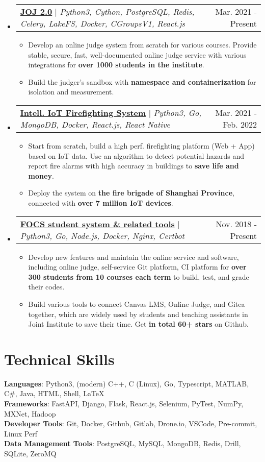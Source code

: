 \documentclass[letterpaper,11pt]{article}
\makeatletter
\newcommand{\resumeItem}[1]{
  \item\small{
    {#1 \vspace{-2pt}}
  }
}
\newcommand{\resumeProjectHeader}[2]{
    \item
    \begin{tabular*}{0.97\textwidth}{l@{\extracolsep{\fill}}r}
      \small#1 & #2 \\
    \end{tabular*}\vspace{-7pt}
}
\newcommand{\resumeSubHeaderListStart}{\begin{itemize}[leftmargin=0.15in, label={}]}
\newcommand{\resumeSubHeaderListEnd}{\end{itemize}}
\newcommand{\resumeItemListStart}{\begin{itemize}}
\newcommand{\resumeItemListEnd}{\end{itemize}\vspace{-5pt}}
\makeatother
\begin{document}
    \resumeSubHeaderListStart
      \resumeProjectHeader
        {\href{https://github.com/joint-online-judge}{\textbf{JOJ 2.0}} $|$ \emph{Python3, Cython, PostgreSQL, Redis, Celery, LakeFS, Docker, CGroupsV1, React.js}}{Mar. 2021 - Present}
        \resumeItemListStart
          \resumeItem{Develop an online judge system from scratch for various courses. Provide stable, secure, fast, well-documented online judge service with various integrations for \textbf{over 1000 students in the institute}.}
          \resumeItem{Build the judger's sandbox with \textbf{namespace and containerization} for isolation and measurement.}
        \resumeItemListEnd
      \resumeProjectHeader
        {\href{https://github.com/SJTU-IPP-Firefighting}{\textbf{Intell. IoT Firefighting System}} $|$ \emph{Python3, Go, MongoDB, Docker, React.js, React Native}}{Mar. 2021 - Feb. 2022}
        \resumeItemListStart
          \resumeItem{Start from scratch, build a high perf. firefighting platform (Web + App) based on IoT data. Use an algorithm to detect potential hazards and report fire alarms with high accuracy in buildings to \textbf{save life and money}.}
          \resumeItem{Deploy the system on \textbf{the fire brigade of Shanghai Province}, connected with \textbf{over 7 million IoT devices}.}
        \resumeItemListEnd
      \resumeProjectHeader
        {\href{https://gist.github.com/BoYanZh/fc4469c20fd6adf42c212114532aaac0}{\textbf{FOCS student system \& related tools}} $|$ \emph{Python3, Go, Node.js, Docker, Nginx, Certbot}}{Nov. 2018 - Present}
        \resumeItemListStart
          \resumeItem{Develop new features and maintain the online service and software, including online judge, self-service Git platform, CI platform for \textbf{over 300 students from 10 courses each term} to build, test, and grade their codes.}
          \resumeItem{Build various tools to connect Canvas LMS, Online Judge, and Gitea together, which are widely used by students and teaching assistants in Joint Institute to save their time. Get \textbf{in total 60+ stars} on Github.}
        \resumeItemListEnd
    \resumeSubHeaderListEnd


%
\section{Technical Skills}
 \begin{itemize}[leftmargin=0.15in, label={}]
    \small{\item{
     \textbf{Languages}{: Python3, (modern) C++, C (Linux), Go, Typescript, MATLAB, C\#, Java, HTML, Shell, \LaTeX} \\
     \textbf{Frameworks}{: FastAPI, Django, Flask, React.js, Selenium, PyTest, NumPy, MXNet, Hadoop} \\
     \textbf{Developer Tools}{: Git, Docker, Github, Gitlab, Drone.io, VSCode, Pre-commit, Linux Perf} \\
     \textbf{Data Management Tools}{: PostgreSQL, MySQL, MongoDB, Redis, Drill, SQLite, ZeroMQ} \\
    }}
 \end{itemize}


\end{document}
